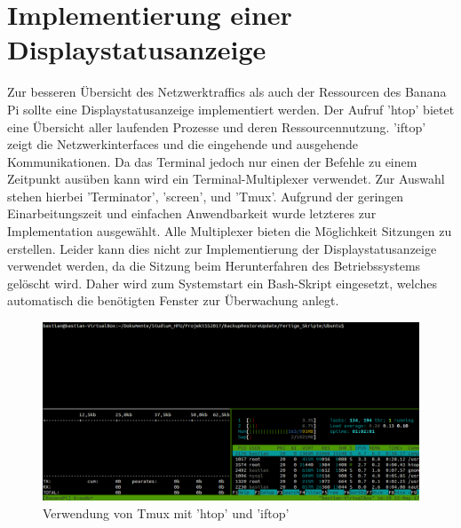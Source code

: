 \section{Implementierung einer Displaystatusanzeige}
Zur besseren Übersicht des Netzwerktraffics als auch der Ressourcen des Banana Pi sollte eine Displaystatusanzeige implementiert werden. Der Aufruf 'htop' bietet eine Übersicht aller laufenden Prozesse und deren Ressourcennutzung. 'iftop' zeigt die Netzwerkinterfaces und die eingehende und ausgehende Kommunikationen. Da das Terminal jedoch nur einen der Befehle zu einem Zeitpunkt ausüben kann wird ein Terminal-Multiplexer verwendet. Zur Auswahl stehen hierbei 'Terminator', 'screen', und 'Tmux'. Aufgrund der geringen Einarbeitungszeit und einfachen Anwendbarkeit wurde letzteres zur Implementation ausgewählt. Alle Multiplexer bieten die Möglichkeit Sitzungen zu erstellen. Leider kann dies nicht zur Implementierung der Displaystatusanzeige verwendet werden, da die Sitzung beim Herunterfahren des Betriebssystems gelöscht wird. Daher wird zum Systemstart ein Bash-Skript eingesetzt, welches automatisch die benötigten Fenster zur Überwachung anlegt.
\begin{figure}[ht]
\includegraphics[width=\textwidth]{pictures/Bastian/Tmux}
\caption{Verwendung von Tmux mit 'htop' und 'iftop'}
\end{figure}

